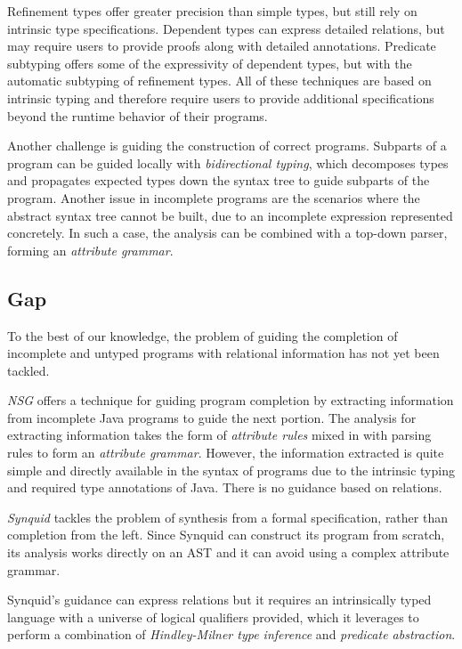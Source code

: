 \documentclass[sigplan,screen,review]{acmart}
\begin{document}
Refinement types offer greater precision than simple types, but still rely on intrinsic type specifications.
Dependent types can express detailed relations, but may require users to provide proofs along with detailed annotations.
Predicate subtyping offers some of the expressivity of dependent types, but with the automatic subtyping of refinement types.
All of these techniques are based on intrinsic typing and therefore require users to provide additional specifications 
beyond the runtime behavior of their programs.


Another challenge is guiding the construction of correct programs.
Subparts of a program can be guided locally with \textit{bidirectional typing}, which decomposes 
types and propagates expected types down the syntax tree to guide subparts of the program. 
Another issue in incomplete programs are the scenarios where the abstract syntax tree cannot be built, 
due to an incomplete expression represented concretely. In such a case, the analysis can be combined with
a top-down parser, forming an \textit{attribute grammar}. 


\subsection{Gap}
To the best of our knowledge, the problem of guiding the completion of incomplete and untyped programs with relational information  
has not yet been tackled.

\textit{NSG} \cite{} offers a technique for guiding program completion by extracting information 
from incomplete Java programs to guide the next portion. The analysis for extracting
information takes the form of \textit{attribute rules} mixed in with parsing rules
to form an \textit{attribute grammar}. However, the information extracted is quite 
simple and directly available in the syntax of programs due to the intrinsic typing and required
type annotations of Java. There is no guidance based on relations. 

\textit{Synquid} \cite{} tackles the problem of synthesis from a formal specification, rather than completion from the left. 
Since Synquid can construct its program from scratch, its analysis works directly on an AST and it can avoid
using a complex attribute grammar.

Synquid's guidance can express relations but it requires an intrinsically typed language with 
a universe of logical qualifiers provided, which it leverages to perform a combination of 
\textit{Hindley-Milner type inference} and \textit{predicate abstraction}.
 
\end{document}
